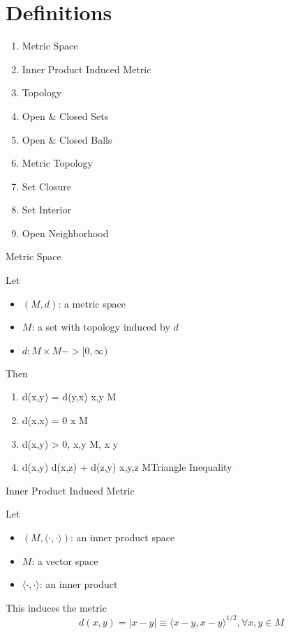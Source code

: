 \section{Definitions}
\begin{enumerate}
    \item Metric Space
    \item Inner Product Induced Metric
    \item Topology
    \item Open \& Closed Sets
    \item Open \& Closed Balls
    \item Metric Topology
    \item Set Closure
    \item Set Interior
    \item Open Neighborhood
\end{enumerate}

\begin{definition}{Metric Space}

    Let
    \begin{itemize}
        \item $(M,d)$: a metric space
        \item $M$: a set with topology induced by $d$
        \item $d: M \times M -> [0, \infty)$
    \end{itemize}
    Then
    \begin{enumerate}
        \item d(x,y) = d(y,x) \forall x,y \in M \hfill{}
        \item d(x,x) = 0 \forall x \in M
        \item d(x,y) > 0, \forall x,y \in M, x \neq y \hfill{}
        \item d(x,y) \leq d(x,z) + d(z,y) \forall x,y,z \in M\hfill{Triangle Inequality}
    \end{enumerate}

\end{definition}

\begin{definition}{Inner Product Induced Metric}

    Let
    \begin{itemize}
        \item $(M, \langle \cdot, \cdot \rangle)$: an inner product space
        \item $M$: a vector space
        \item $\langle \cdot, \cdot \rangle$: an inner product
    \end{itemize}
    This induces the metric
    \begin{equation}
        d(x,y) = |x-y| \equiv \langle x-y, x-y \rangle^{1/2}, \forall x,y \in M
    \end{equation}

\end{definition}

